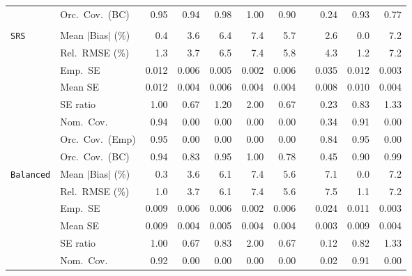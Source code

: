\begin{landscape}
\begin{longtable}{llrrrrrrrrr}
 & Orc.\ Cov.\ (BC) & \cellcolor{rankone}0.95 & \cellcolor{ranktwo}0.94 & 0.98 & 1.00 & 0.90 &  & 0.24 & \cellcolor{rankthree}0.93 & 0.77 \\
\addlinespace[2pt]
\multicolumn{11}{l}{\textbf{Interaction}} \\
\addlinespace[2pt]
\quad \texttt{SRS} & Mean $|$Bias$|$ (\%) & \cellcolor{ranktwo}0.4 & 3.6 & 6.4 & 7.4 & 5.7 &  & \cellcolor{rankthree}2.6 & \cellcolor{rankone}0.0 & 7.2 \\
 & Rel.\ RMSE (\%) & \cellcolor{ranktwo}1.3 & \cellcolor{rankthree}3.7 & 6.5 & 7.4 & 5.8 &  & 4.3 & \cellcolor{rankone}1.2 & 7.2 \\
 & Emp.\ SE & 0.012 & 0.006 & 0.005 & 0.002 & 0.006 &  & 0.035 & 0.012 & 0.003 \\
 & Mean SE & 0.012 & 0.004 & 0.006 & 0.004 & 0.004 &  & 0.008 & 0.010 & 0.004 \\
 & SE ratio & \cellcolor{rankone}1.00 & 0.67 & \cellcolor{rankthree}1.20 & 2.00 & 0.67 &  & 0.23 & \cellcolor{ranktwo}0.83 & 1.33 \\
 & Nom.\ Cov. & \cellcolor{rankone}0.94 & 0.00 & 0.00 & 0.00 & 0.00 &  & \cellcolor{rankthree}0.34 & \cellcolor{ranktwo}0.91 & 0.00 \\
 & Orc.\ Cov.\ (Emp) & \cellcolor{rankone}0.95 & \cellcolor{rankthree}0.00 & \cellcolor{rankthree}0.00 & \cellcolor{rankthree}0.00 & \cellcolor{rankthree}0.00 &  & \cellcolor{ranktwo}0.84 & \cellcolor{rankone}0.95 & \cellcolor{rankthree}0.00 \\
 & Orc.\ Cov.\ (BC) & \cellcolor{ranktwo}0.94 & 0.83 & \cellcolor{rankone}0.95 & 1.00 & 0.78 &  & 0.45 & 0.90 & \cellcolor{rankthree}0.99 \\
\addlinespace[2pt]
\quad \texttt{Balanced} & Mean $|$Bias$|$ (\%) & \cellcolor{ranktwo}0.3 & \cellcolor{rankthree}3.6 & 6.1 & 7.4 & 5.6 &  & 7.1 & \cellcolor{rankone}0.0 & 7.2 \\
 & Rel.\ RMSE (\%) & \cellcolor{rankone}1.0 & \cellcolor{rankthree}3.7 & 6.1 & 7.4 & 5.6 &  & 7.5 & \cellcolor{ranktwo}1.1 & 7.2 \\
 & Emp.\ SE & 0.009 & 0.006 & 0.006 & 0.002 & 0.006 &  & 0.024 & 0.011 & 0.003 \\
 & Mean SE & 0.009 & 0.004 & 0.005 & 0.004 & 0.004 &  & 0.003 & 0.009 & 0.004 \\
 & SE ratio & \cellcolor{rankone}1.00 & 0.67 & \cellcolor{ranktwo}0.83 & 2.00 & 0.67 &  & 0.12 & \cellcolor{rankthree}0.82 & 1.33 \\
 & Nom.\ Cov. & \cellcolor{rankone}0.92 & 0.00 & 0.00 & 0.00 & 0.00 &  & \cellcolor{rankthree}0.02 & \cellcolor{ranktwo}0.91 & 0.00 \\

\end{longtable}
\end{landscape}
